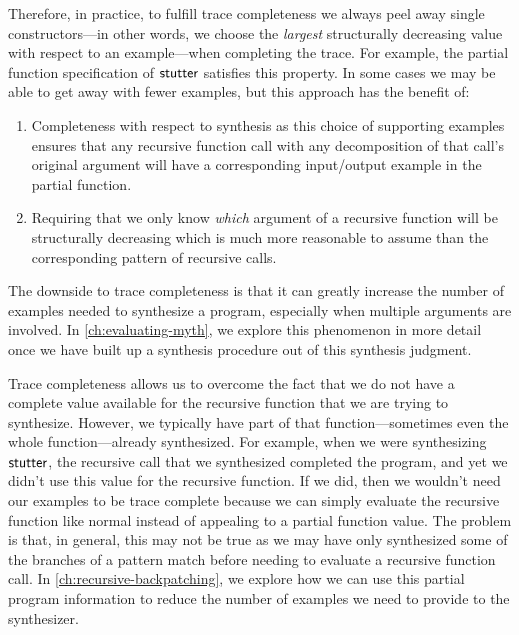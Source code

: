 Therefore, in practice, to fulfill trace completeness we always peel away single constructors---in other words, we choose the \emph{largest} structurally decreasing value with respect to an example---when completing the trace.
For example, the partial function specification of $\mathsf{stutter}$ satisfies this property.
In some cases we may be able to get away with fewer examples, but this approach has the benefit of:
\begin{enumerate}
  \item Completeness with respect to synthesis as this choice of supporting examples ensures that any recursive function call with any decomposition of that call's original argument will have a corresponding input/output example in the partial function.
  \item Requiring that we only know \emph{which} argument of a recursive function will be structurally decreasing which is much more reasonable to assume than the corresponding pattern of recursive calls.
\end{enumerate}
The downside to trace completeness is that it can greatly increase the number of examples needed to synthesize a program, especially when multiple arguments are involved.
In \autoref{ch:evaluating-myth}, we explore this phenomenon in more detail once we have built up a synthesis procedure out of this synthesis judgment.

Trace completeness allows us to overcome the fact that we do not have a complete value available for the recursive function that we are trying to synthesize.
However, we typically have part of that function---sometimes even the whole function---already synthesized.
For example, when we were synthesizing $\mathsf{stutter}$, the recursive call that we synthesized completed the program, and yet we didn't use this value for the recursive function.
If we did, then we wouldn't need our examples to be trace complete because we can simply evaluate the recursive function like normal instead of appealing to a partial function value.
The problem is that, in general, this may not be true as we may have only synthesized some of the branches of a pattern match before needing to evaluate a recursive function call.
In \autoref{ch:recursive-backpatching}, we explore how we can use this partial program information to reduce the number of examples we need to provide to the synthesizer.
